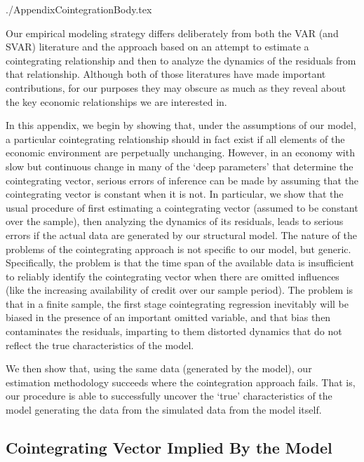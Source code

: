 \documentclass{\econtex}
\begin{document}
\begin{verbatimwrite}{./AppendixCointegrationBody.tex}

Our empirical modeling strategy differs deliberately from both the VAR
(and SVAR) literature and the approach based on an attempt to estimate 
a cointegrating relationship and then to analyze the dynamics of the residuals
from that relationship.  Although both of those literatures have made important
contributions, for our purposes they may obscure as much as they reveal 
about the key economic relationships we are interested in.

In this appendix, we begin by showing that, under the assumptions of our model,
a particular cointegrating relationship should in fact exist if all elements of 
the economic environment are perpetually unchanging.  However, in an economy 
with slow but continuous change in many of the `deep parameters' that determine
the cointegrating vector, serious errors of inference can be made by assuming that
the cointegrating vector is constant when it is not.  In particular, we show that
the usual procedure of first estimating a cointegrating vector (assumed to be constant 
over the sample), then analyzing the dynamics of its residuals, leads to serious errors
if the actual data are generated by our structural model.  The nature of the problems
of the cointegrating approach is not specific to our model, but generic.  Specifically,
the problem is that the time span of the available data is insufficient to reliably 
identify the cointegrating vector when there are omitted influences (like the 
increasing availability of credit over our sample period).  The problem is that in a 
finite sample, the first stage cointegrating regression inevitably will be biased 
in the presence of an important omitted variable, and that bias then contaminates
the residuals, imparting to them distorted dynamics that do not reflect the true
characteristics of the model.

We then show that, using the same data (generated by the model), our estimation methodology 
succeeds where the cointegration approach fails.  That is, our procedure is able to 
successfully uncover the `true' characteristics of the model generating the data 
from the simulated data from the model itself.  

\subsection{Cointegrating Vector Implied By the Model}


\end{verbatimwrite}
\end{document}
